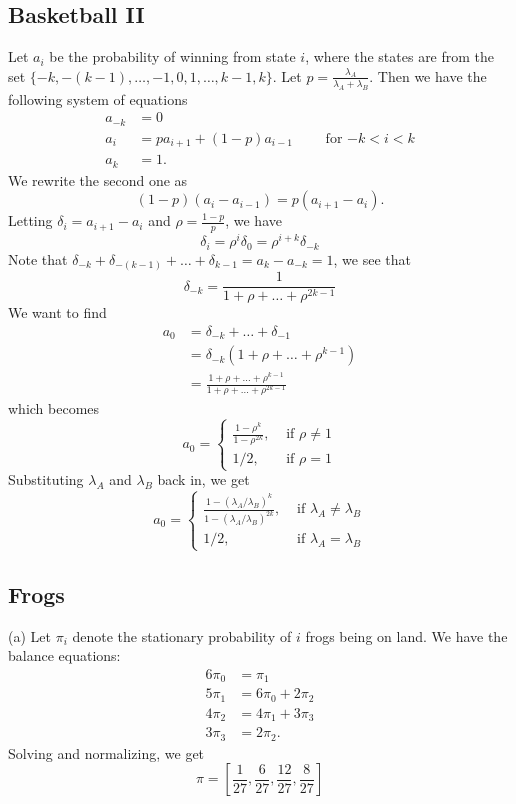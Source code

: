 \subsection{Basketball II}
Let $a_i$ be the probability of winning from state $i$, where the states are from the set $\{-k, -(k - 1), \dots, -1, 0, 1, \dots, k-1, k\}$. Let $p = \frac{\lambda_A}{\lambda_A + \lambda_B}$. Then we have the following system of equations
\begin{align*}
    a_{-k} &= 0 \\
    a_{i} &= pa_{i + 1} + (1 - p)a_{i - 1} \qquad \text{ for $-k < i < k$} \\
    a_k &= 1.
\end{align*}
We rewrite the second one as
\[
(1 - p)(a_i - a_{i - 1}) = p(a_{i + 1} - a_i).
\]
Letting $\delta_i = a_{i + 1} - a_i$ and $\rho = \frac{1 - p}{p}$, we have
\[
\delta_i = \rho^i\delta_0 = \rho^{i + k}\delta_{-k}
\]
Note that $\delta_{-k} + \delta_{-(k - 1)} + \dots + \delta_{k - 1} = a_k - a_{-k} = 1$, we see that 
\[
\delta_{-k} = \frac{1}{1 + \rho + \dots + \rho^{2k - 1}}
\]
We want to find 
\begin{align*}
    a_0 &= \delta_{-k} + \dots + \delta_{-1} \\
        &= \delta_{-k}(1 + \rho + \dots + \rho^{k - 1}) \\
        &= \frac{1 + \rho + \dots + \rho^{k - 1}}{1 + \rho + \dots + \rho^{2k - 1}}
\end{align*}
which becomes
\[
a_0 = 
\begin{cases}
    \frac{1 - \rho^k}{1 - \rho^{2k}}, &\text{ if $\rho \neq 1$} \\
    1/2, &\text{ if $\rho = 1$}
\end{cases}
\]
Substituting $\lambda_A$ and $\lambda_B$ back in, we get
\[
a_0 = 
\begin{cases}
    \frac{1 - (\lambda_A/\lambda_B)^k}{1 - (\lambda_A/\lambda_B)^{2k}}, &\text{ if $\lambda_A \neq \lambda_B$} \\
    1/2, &\text{ if $\lambda_A = \lambda_B$}
\end{cases}
\]


\subsection{Frogs}
(a) Let $\pi_i$ denote the stationary probability of $i$ frogs being on land. We have the balance equations:
\begin{align*}
    6\pi_0 &= \pi_1 \\
    5\pi_1 &= 6\pi_0 + 2\pi_2 \\
    4\pi_2 &= 4\pi_1 + 3\pi_3 \\
    3\pi_3 &= 2\pi_2.
\end{align*}
Solving and normalizing, we get
\[
    \pi = \left[\frac{1}{27}, \frac{6}{27}, \frac{12}{27}, \frac{8}{27}\right]
\]

